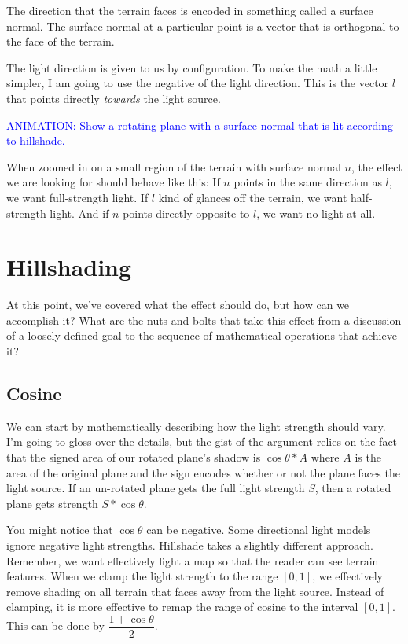 \documentclass{article}
\newcommand\animation[1]{\textcolor{blue}{ANIMATION: #1}}
\begin{document}
The direction that the terrain faces is encoded in something called a surface normal.
The surface normal at a particular point is a vector that is orthogonal to the face of the terrain.

The light direction is given to us by configuration.
To make the math a little simpler, I am going to use the negative of the light direction.
This is the vector $l$ that points directly \textit{towards} the light source.

\animation{Show a rotating plane with a surface normal that is lit according to hillshade.}

When zoomed in on a small region of the terrain with surface normal $n$, the effect we are looking for should behave like this:
If $n$ points in the same direction as $l$, we want full-strength light.
If $l$ kind of glances off the terrain, we want half-strength light.
And if $n$ points directly opposite to $l$, we want no light at all.

\section{Hillshading}

At this point, we've covered what the effect should do, but how can we accomplish it?
What are the nuts and bolts that take this effect from a discussion of a loosely defined goal to the sequence of mathematical operations that achieve it?

\subsection{Cosine}

We can start by mathematically describing how the light strength should vary.
I'm going to gloss over the details, but the gist of the argument relies on the fact that the signed area of our rotated plane's shadow is $\cos \theta * A$ where $A$ is the area of the original plane and the sign encodes whether or not the plane faces the light source.
If an un-rotated plane gets the full light strength $S$, then a rotated plane gets strength $S * \cos \theta$.

You might notice that $\cos \theta$ can be negative.
Some directional light models ignore negative light strengths.
Hillshade takes a slightly different approach.
Remember, we want effectively light a map so that the reader can see terrain features.
When we clamp the light strength to the range $[0, 1]$, we effectively remove shading on all terrain that faces away from the light source.
Instead of clamping, it is more effective to remap the range of cosine to the interval $[0, 1]$.
This can be done by $\dfrac{1 + \cos \theta}{2}$.
\end{document}
